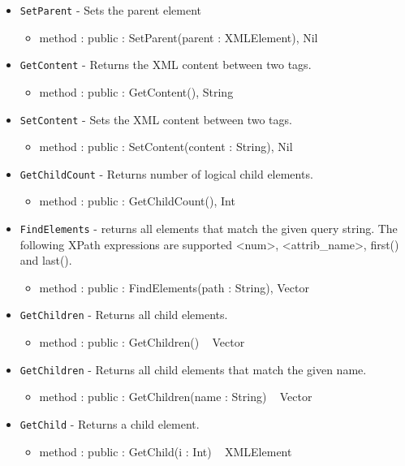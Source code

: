 \documentclass[12pt]{article}
\begin{document}
\begin{itemize}
\item \texttt{SetParent} - Sets the parent element
  \begin{itemize}
  \item method : public : SetParent(parent : XMLElement), Nil
  \end{itemize}
\item \texttt{GetContent} - Returns the XML content between two tags.
  \begin{itemize}
  \item method : public : GetContent(), String
  \end{itemize}
\item \texttt{SetContent} - Sets the XML content between two tags.
  \begin{itemize}
  \item method : public : SetContent(content : String), Nil
  \end{itemize}
\item \texttt{GetChildCount} - Returns number of logical child elements.
  \begin{itemize}
  \item method : public : GetChildCount(), Int
  \end{itemize}
\item \texttt{FindElements} - returns all elements that match the given query string.  The following XPath expressions are supported <num>, <attrib\_name>, first() and last().
  \begin{itemize}
  \item method : public : FindElements(path : String), Vector
  \end{itemize}
\item \texttt{GetChildren} - Returns all child elements.
  \begin{itemize}
  \item method : public : GetChildren() ~ Vector
  \end{itemize}
\item \texttt{GetChildren} - Returns all child elements that match the given name.
  \begin{itemize}
  \item method : public : GetChildren(name : String) ~ Vector
  \end{itemize}
\item \texttt{GetChild} - Returns a child element.
  \begin{itemize}
  \item method : public : GetChild(i : Int) ~ XMLElement
  \end{itemize}

\end{itemize}
\end{document}
